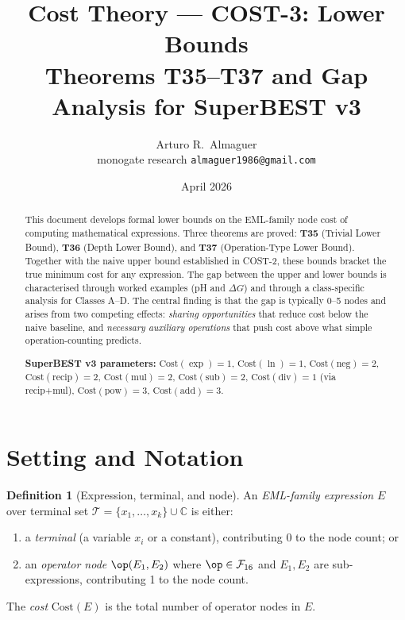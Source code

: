 \documentclass[12pt,a4paper]{article}
\title{Cost Theory --- COST-3: Lower Bounds\\[4pt]
       \large Theorems T35--T37 and Gap Analysis for SuperBEST v3}
\author{Arturo R.\ Almaguer\\
\small monogate research \quad \texttt{almaguer1986@gmail.com}}
\date{April 2026}
\theoremstyle{definition}
\newtheorem{definition}[theorem]{Definition}
\newcommand{\Cost}{\mathrm{Cost}}
\newcommand{\Fam}{\mathcal{F}}
\newcommand{\Term}{\mathcal{T}}
\begin{document}
\maketitle

\begin{abstract}
This document develops formal lower bounds on the EML-family node cost of
computing mathematical expressions.  Three theorems are proved:
\textbf{T35} (Trivial Lower Bound),
\textbf{T36} (Depth Lower Bound), and
\textbf{T37} (Operation-Type Lower Bound).
Together with the naive upper bound established in COST-2, these bounds
bracket the true minimum cost for any expression.  The gap between the upper
and lower bounds is characterised through worked examples (pH and $\Delta G$)
and through a class-specific analysis for Classes A--D.
The central finding is that the gap is typically 0--5 nodes and arises from
two competing effects: \emph{sharing opportunities} that reduce cost below
the naive baseline, and \emph{necessary auxiliary operations} that push cost
above what simple operation-counting predicts.

\medskip
\noindent\textbf{SuperBEST v3 parameters:}
$\Cost(\exp)=1$, $\Cost(\ln)=1$, $\Cost(\mathrm{neg})=2$,
$\Cost(\mathrm{recip})=2$, $\Cost(\mathrm{mul})=2$, $\Cost(\mathrm{sub})=2$,
$\Cost(\mathrm{div})=1$ (via recip+mul), $\Cost(\mathrm{pow})=3$,
$\Cost(\mathrm{add})=3$.
\end{abstract}

\tableofcontents
\bigskip

\section{Setting and Notation}

\begin{definition}[Expression, terminal, and node]\label{def:expression}
An \emph{EML-family expression} $E$ over terminal set
$\Term = \{x_1,\ldots,x_k\} \cup \mathbb{C}$ is either:
\begin{enumerate}
  \item a \emph{terminal} (a variable $x_i$ or a constant), contributing 0
        to the node count; or
  \item an \emph{operator node} $\op(E_1,E_2)$ where $\op \in \Fam_{16}$
        and $E_1, E_2$ are sub-expressions, contributing 1 to the node count.
\end{enumerate}
The \emph{cost} $\Cost(E)$ is the total number of operator nodes in $E$.
\end{definition}
\end{document}
